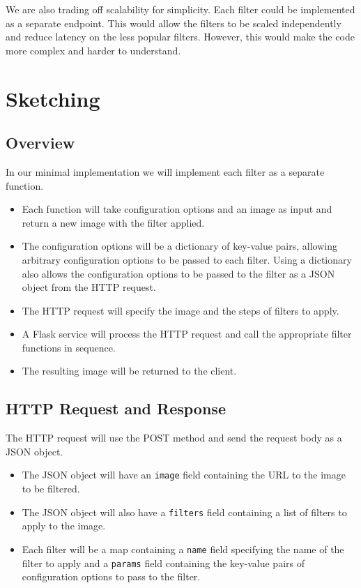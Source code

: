 \documentclass{csse4400}
\begin{document}
We are also trading off scalability for simplicity.
Each filter could be implemented as a separate endpoint.
This would allow the filters to be scaled independently and reduce latency on the less popular filters.
However, this would make the code more complex and harder to understand.


\section{Sketching}

\subsection{Overview}
In our minimal implementation we will implement each filter as a separate function.
\begin{itemize}
    \item Each function will take configuration options and an image as input and return a new image with the filter applied.
    \item The configuration options will be a dictionary of key-value pairs, allowing arbitrary configuration options to be passed to each filter.
    Using a dictionary also allows the configuration options to be passed to the filter as a JSON object from the HTTP request.
    \item The HTTP request will specify the image and the steps of filters to apply.
    \item A Flask service will process the HTTP request and call the appropriate filter functions in sequence.
    \item The resulting image will be returned to the client.
\end{itemize}

\subsection{HTTP Request and Response}
The HTTP request will use the POST method and send the request body as a JSON object.
\begin{itemize}
    \item The JSON object will have an \texttt{image} field containing the URL to the image to be filtered.
    \item The JSON object will also have a \texttt{filters} field containing a list of filters to apply to the image.
    \item Each filter will be a map containing a \texttt{name} field specifying the name of the filter to apply and a \texttt{params} field containing the key-value pairs of configuration options to pass to the filter.
\end{itemize}
\end{document}
